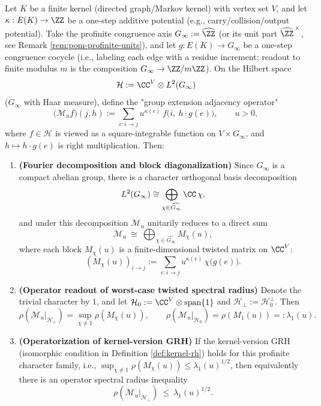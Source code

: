 \begin{proposition}\label{prop:pom-profinite-artin-hilbert}
Let \(K\) be a finite kernel (directed graph/Markov kernel) with vertex set \(V\), and let \(\kappa:E(K)\to\ZZ\) be a one-step additive potential (e.g., carry/collision/output potential).
Take the profinite congruence axis \(G_\infty:=\widehat{\ZZ}\) (or its unit part \(\widehat{\ZZ}^{\,\times}\), see Remark \ref{rem:pom-profinite-units}), and let
\(
g:E(K)\to G_\infty
\)
be a one-step congruence cocycle (i.e., labeling each edge with a residue increment; readout to finite modulus \(m\) is the composition \(G_\infty\to\ZZ/m\ZZ\)).
On the Hilbert space
\[
\mathcal{H}:=\CC^{V}\otimes L^2(G_\infty)
\]
(\(G_\infty\) with Haar measure), define the "group extension adjacency operator"
\[
\bigl(\mathcal{M}_u f\bigr)(j,h)
:=\sum_{e:i\to j} u^{\kappa(e)}\, f\!\bigl(i,\ h\cdot g(e)\bigr),
\qquad u>0,
\]
where \(f\in\mathcal{H}\) is viewed as a square-integrable function on \(V\times G_\infty\), and \(h\mapsto h\cdot g(e)\) is right multiplication.
Then:
\begin{enumerate}
  \item \textbf{(Fourier decomposition and block diagonalization)} Since \(G_\infty\) is a compact abelian group, there is a character orthogonal basis decomposition
  \[
  L^2(G_\infty)\cong \bigoplus_{\chi\in\widehat{G_\infty}}\CC\,\chi,
  \]
  and under this decomposition \(\mathcal{M}_u\) unitarily reduces to a direct sum
  \[
  \mathcal{M}_u\ \cong\ \bigoplus_{\chi\in\widehat{G_\infty}} M_\chi(u),
  \]
  where each block \(M_\chi(u)\) is a finite-dimensional twisted matrix on \(\CC^{V}\):
  \[
  (M_\chi(u))_{i\to j}:=\sum_{e:i\to j} u^{\kappa(e)}\,\chi\!\bigl(g(e)\bigr).
  \]
  \item \textbf{(Operator readout of worst-case twisted spectral radius)} Denote the trivial character by \(1\), and let
  \(
  \mathcal{H}_0:=\CC^V\otimes\mathrm{span}\{1\}
  \)
  and \(\mathcal{H}_\perp:=\mathcal{H}_0^\perp\).
  Then
  \[
  \rho\!\left(\mathcal{M}_u|_{\mathcal{H}_\perp}\right)
  =\sup_{\chi\neq 1}\rho\!\left(M_\chi(u)\right),
  \qquad
  \rho\!\left(\mathcal{M}_u|_{\mathcal{H}_0}\right)=\rho\!\left(M_1(u)\right)=:\lambda_1(u).
  \]
  \item \textbf{(Operatorization of kernel-version GRH)} If the kernel-version GRH (isomorphic condition in Definition \ref{def:kernel-rh}) holds for this profinite character family, i.e.,
  \(
  \sup_{\chi\neq 1}\rho(M_\chi(u))\le \lambda_1(u)^{1/2}
  \),
  then equivalently there is an operator spectral radius inequality
  \[
  \rho\!\left(\mathcal{M}_u|_{\mathcal{H}_\perp}\right)\ \le\ \lambda_1(u)^{1/2}.
  \]
\end{enumerate}
\end{proposition}
